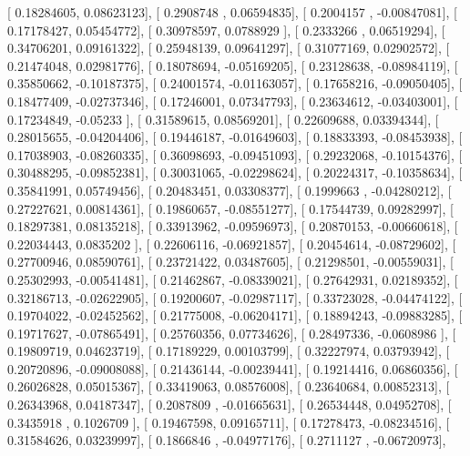\documentclass{article}
\begin{document}
       [ 0.18284605,  0.08623123],
       [ 0.2908748 ,  0.06594835],
       [ 0.2004157 , -0.00847081],
       [ 0.17178427,  0.05454772],
       [ 0.30978597,  0.0788929 ],
       [ 0.2333266 ,  0.06519294],
       [ 0.34706201,  0.09161322],
       [ 0.25948139,  0.09641297],
       [ 0.31077169,  0.02902572],
       [ 0.21474048,  0.02981776],
       [ 0.18078694, -0.05169205],
       [ 0.23128638, -0.08984119],
       [ 0.35850662, -0.10187375],
       [ 0.24001574, -0.01163057],
       [ 0.17658216, -0.09050405],
       [ 0.18477409, -0.02737346],
       [ 0.17246001,  0.07347793],
       [ 0.23634612, -0.03403001],
       [ 0.17234849, -0.05233   ],
       [ 0.31589615,  0.08569201],
       [ 0.22609688,  0.03394344],
       [ 0.28015655, -0.04204406],
       [ 0.19446187, -0.01649603],
       [ 0.18833393, -0.08453938],
       [ 0.17038903, -0.08260335],
       [ 0.36098693, -0.09451093],
       [ 0.29232068, -0.10154376],
       [ 0.30488295, -0.09852381],
       [ 0.30031065, -0.02298624],
       [ 0.20224317, -0.10358634],
       [ 0.35841991,  0.05749456],
       [ 0.20483451,  0.03308377],
       [ 0.1999663 , -0.04280212],
       [ 0.27227621,  0.00814361],
       [ 0.19860657, -0.08551277],
       [ 0.17544739,  0.09282997],
       [ 0.18297381,  0.08135218],
       [ 0.33913962, -0.09596973],
       [ 0.20870153, -0.00660618],
       [ 0.22034443,  0.0835202 ],
       [ 0.22606116, -0.06921857],
       [ 0.20454614, -0.08729602],
       [ 0.27700946,  0.08590761],
       [ 0.23721422,  0.03487605],
       [ 0.21298501, -0.00559031],
       [ 0.25302993, -0.00541481],
       [ 0.21462867, -0.08339021],
       [ 0.27642931,  0.02189352],
       [ 0.32186713, -0.02622905],
       [ 0.19200607, -0.02987117],
       [ 0.33723028, -0.04474122],
       [ 0.19704022, -0.02452562],
       [ 0.21775008, -0.06204171],
       [ 0.18894243, -0.09883285],
       [ 0.19717627, -0.07865491],
       [ 0.25760356,  0.07734626],
       [ 0.28497336, -0.0608986 ],
       [ 0.19809719,  0.04623719],
       [ 0.17189229,  0.00103799],
       [ 0.32227974,  0.03793942],
       [ 0.20720896, -0.09008088],
       [ 0.21436144, -0.00239441],
       [ 0.19214416,  0.06860356],
       [ 0.26026828,  0.05015367],
       [ 0.33419063,  0.08576008],
       [ 0.23640684,  0.00852313],
       [ 0.26343968,  0.04187347],
       [ 0.2087809 , -0.01665631],
       [ 0.26534448,  0.04952708],
       [ 0.3435918 ,  0.1026709 ],
       [ 0.19467598,  0.09165711],
       [ 0.17278473, -0.08234516],
       [ 0.31584626,  0.03239997],
       [ 0.1866846 , -0.04977176],
       [ 0.2711127 , -0.06720973],
\end{document}
